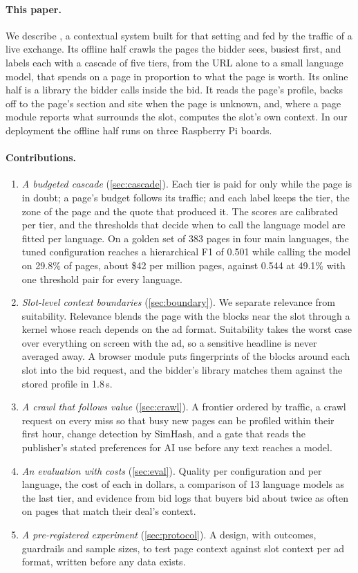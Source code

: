 \paragraph{This paper.} We describe \sys{}, a contextual system built for that setting and fed by the traffic of a live exchange. Its offline half crawls the pages the bidder sees, busiest first, and labels each with a cascade of five tiers, from the URL alone to a small language model, that spends on a page in proportion to what the page is worth. Its online half is a library the bidder calls inside the bid. It reads the page's profile, backs off to the page's section and site when the page is unknown, and, where a page module reports what surrounds the slot, computes the slot's own context. In our deployment the offline half runs on three Raspberry Pi boards.

\paragraph{Contributions.}
\begin{enumerate}[leftmargin=1.8em,itemsep=2pt]
\item \emph{A budgeted cascade} (\cref{sec:cascade}). Each tier is paid for only while the page is in doubt; a page's budget follows its traffic; and each label keeps the tier, the zone of the page and the quote that produced it. The scores are calibrated per tier, and the thresholds that decide when to call the language model are fitted per language. On a golden set of 383 pages in four main languages, the tuned configuration reaches a hierarchical F1 of 0.501 while calling the model on 29.8\% of pages, about \$42 per million pages, against 0.544 at 49.1\% with one threshold pair for every language.
\item \emph{Slot-level context boundaries} (\cref{sec:boundary}). We separate relevance from suitability. Relevance blends the page with the blocks near the slot through a kernel whose reach depends on the ad format. Suitability takes the worst case over everything on screen with the ad, so a sensitive headline is never averaged away. A browser module puts fingerprints of the blocks around each slot into the bid request, and the bidder's library matches them against the stored profile in 1.8\,\textmu s.
\item \emph{A crawl that follows value} (\cref{sec:crawl}). A frontier ordered by traffic, a crawl request on every miss so that busy new pages can be profiled within their first hour, change detection by SimHash, and a gate that reads the publisher's stated preferences for AI use before any text reaches a model.
\item \emph{An evaluation with costs} (\cref{sec:eval}). Quality per configuration and per language, the cost of each in dollars, a comparison of 13 language models as the last tier, and evidence from bid logs that buyers bid about twice as often on pages that match their deal's context.
\item \emph{A pre-registered experiment} (\cref{sec:protocol}). A design, with outcomes, guardrails and sample sizes, to test page context against slot context per ad format, written before any data exists.
\end{enumerate}

